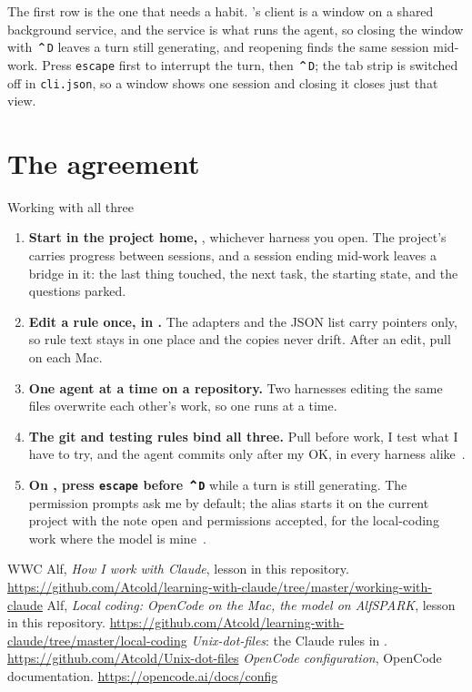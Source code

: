 \documentclass[11pt,a4paper]{article}
\newcommand{\home}{\textasciitilde}  %
\begin{document}
The first row is the one that needs a habit. 's client is a window on a shared background service, and the service is what runs the agent, so closing the window with ⌃\texttt{D} leaves a turn still generating, and reopening finds the same session mid-work. Press \texttt{escape} first to interrupt the turn, then ⌃\texttt{D}; the tab strip is switched off in \texttt{cli.json}, so a window shows one session and closing it closes just that view.

\section{The agreement}

\begin{result}{Working with all three}
\begin{enumerate}[leftmargin=1.4em]
  \item \textbf{Start in the project home,} \name{\home/\lk{PARA}/Projects/<name>/}, whichever harness you open. The project's  carries progress between sessions, and a session ending mid-work leaves a bridge in it: the last thing touched, the next task, the starting state, and the questions parked.
  \item \textbf{Edit a rule once, in \name{\home/.settings/Claude/rules/}.} The adapters and the JSON list carry pointers only, so rule text stays in one place and the copies never drift. After an edit, pull  on each Mac.
  \item \textbf{One agent at a time on a repository.} Two harnesses editing the same files overwrite each other's work, so one runs at a time.
  \item \textbf{The git and testing rules bind all three.} Pull before work, I test what I have to try, and the agent commits only after my OK, in every harness alike~\cite{wwc}.
  \item \textbf{On , press \texttt{escape} before ⌃\texttt{D}} while a turn is still generating. The permission prompts ask me by default; the  alias starts it on the current project with the note open and permissions accepted, for the local-coding work where the model is mine~\cite{lc}.
\end{enumerate}
\end{result}

\begin{thebibliography}{WWC}
   Alf, \textit{How I work with Claude}, lesson in this repository. \url{https://github.com/Atcold/learning-with-claude/tree/master/working-with-claude}
   Alf, \textit{Local coding: OpenCode on the Mac, the model on AlfSPARK}, lesson in this repository. \url{https://github.com/Atcold/learning-with-claude/tree/master/local-coding}
   \textit{Unix-dot-files}: the Claude rules in . \url{https://github.com/Atcold/Unix-dot-files}
   \textit{OpenCode configuration}, OpenCode documentation. \url{https://opencode.ai/docs/config}
\end{thebibliography}

\revisiontable
\end{document}

